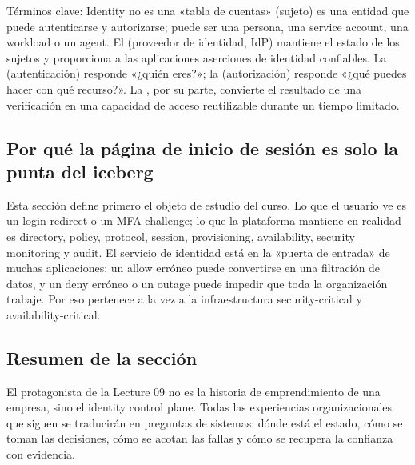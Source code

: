 \begin{knowledgebox}{Términos clave: Identity no es una «tabla de cuentas»}
 (sujeto) es una entidad que puede autenticarse y autorizarse; puede ser una persona, una service account, una workload o un agent. El  (proveedor de identidad, IdP) mantiene el estado de los sujetos y proporciona a las aplicaciones aserciones de identidad confiables. La  (autenticación) responde «¿quién eres?»; la  (autorización) responde «¿qué puedes hacer con qué recurso?». La , por su parte, convierte el resultado de una verificación en una capacidad de acceso reutilizable durante un tiempo limitado.
\end{knowledgebox}

\subsection{Por qué la página de inicio de sesión es solo la punta del iceberg}

Esta sección define primero el objeto de estudio del curso. Lo que el usuario ve es un login redirect o un MFA challenge; lo que la plataforma mantiene en realidad es directory, policy, protocol, session, provisioning, availability, security monitoring y audit. El servicio de identidad está en la «puerta de entrada» de muchas aplicaciones: un allow erróneo puede convertirse en una filtración de datos, y un deny erróneo o un outage puede impedir que toda la organización trabaje. Por eso pertenece a la vez a la infraestructura security-critical y availability-critical.

\subsection{Resumen de la sección}

El protagonista de la Lecture 09 no es la historia de emprendimiento de una empresa, sino el identity control plane. Todas las experiencias organizacionales que siguen se traducirán en preguntas de sistemas: dónde está el estado, cómo se toman las decisiones, cómo se acotan las fallas y cómo se recupera la confianza con evidencia.
